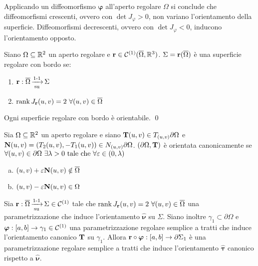 \begin{remark}
	Applicando un diffeomorfismo $\bm\varphi$ all'aperto regolare $\Omega$ si conclude che diffeomorfismi crescenti, ovvero con $\det J_\varphi>0$, non variano l'orientamento della superficie. Diffeomorfismi decrescenti, ovvero con $\det J_\varphi<0$, inducono l'orientamento opposto.
\end{remark}

\begin{definition}
	Siano $\Omega \subseteq \mathbb{R}^2$ un aperto regolare e $\vb{r} \in \mathcal{C}^{(1)}(\overline{\Omega},\mathbb{R}^3)$. $\Sigma = \vb{r}(\overline{\Omega})$ è una superficie regolare con bordo se:
	\begin{enumerate}
		\item $\vb{r}:\overline{\Omega}\operatorname{\xrightarrow[\operatorname{su}]{\operatorname{1-1}}}\Sigma$
		\item $\rank J_{\vb{r}}(u,v) = 2 \ \forall (u,v) \in \overline{\Omega}$
	\end{enumerate}
\end{definition}

\begin{theorem}
	Ogni superficie regolare con bordo è orientabile. \qed
\end{theorem}

\begin{definition}
	Sia $\Omega \subseteq \mathbb{R}^2$ un aperto regolare e siano $\vb{T}(u,v)\in T_{(u,v)}\partial\Omega$ e $\vb{N}(u,v)=(T_2(u,v),-T_1(u,v))\in N_{(u,v)}\partial\Omega$. $(\partial \Omega, \vb{T})$ è orientata canonicamente se $\forall (u,v) \in \partial \Omega \ \exists \lambda > 0 \text{ tale che } \forall \varepsilon \in (0,\lambda)$
	\begin{enumerate}[a.]
		\item $(u,v)+\varepsilon\vb{N}(u,v) \notin \overline{\Omega}$
		\item $(u,v)-\varepsilon\vb{N}(u,v) \in \Omega$
	\end{enumerate}
\end{definition}

\begin{definition}
	Sia $\vb{r}: \overline{\Omega} \operatorname{\xrightarrow[\operatorname{su}]{\operatorname{1-1}}} \Sigma \in \mathcal{C}^{(1)}$ tale che $\rank J_{\vb{r}}(u,v)=2 \ \forall (u,v) \in \overline{\Omega}$ una parametrizzazione che induce l'orientamento $\hat{\bm\nu}$ su $\Sigma$. Siano inoltre $\gamma_1 \subset \partial\Omega$ e $\bm\varphi: [a,b]\to \gamma_1 \in \mathcal{C}^{(1)}$ una parametrizzazione regolare semplice a tratti che induce l'orientamento canonico $\vb{T}$ su $\gamma_1$.
	Allora $\vb{r}\circ \bm\varphi:[a,b]\to \partial\Sigma_1$ è una parametrizzazione regolare semplice a tratti che induce l'orientamento $\hat{\bm\tau}$ canonico rispetto a $\hat{\bm\nu}$.
\end{definition}

